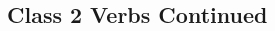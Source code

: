 \begin{tabular}{|*{7}{@{}c@{}|}l|}
     \xc{}{}{} {} {}{}\xd{}{}{}{}{}{} &   %
     \xa{}{}{} {} {}{}\xb{}{}{}{}{}{}     %
     \xc{}{}{} {} {}{}\xd{}{}{}{}{}{} &   %
     \xa{}{}{} {} {}{}\xb{}{}{}{}{}{}     %
     \xc{}{}{} {} {}{}\xd{}{}{}{}{}{} &&  %
     \xa{}{}{} {} {}{}\xb{}{}{}{}{}{}     %
     \xc{}{}{} {} {}{}\xd{}{}{}{}{}{} &   %
     \xa{}{}{} {} {}{}\xb{}{}{}{}{}{}     %
     \xc{}{}{} {} {}{}\xd{}{}{}{}{}{} &   %
\\ \hline
\end{tabular}


\noi
\subsection*{Class 2 Verbs Continued}
\hspace*{-1.50in}
